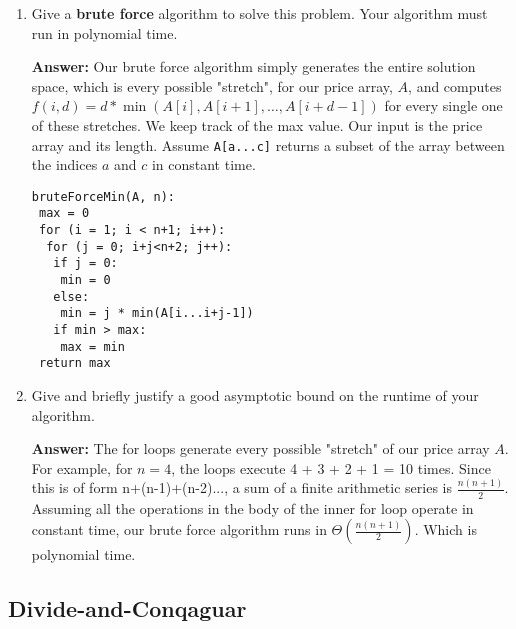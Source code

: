 \documentclass[11pt, oneside]{article}   	%
\theoremstyle{definition}
\theoremstyle{remark}
\begin{document}
\begin{enumerate}
\item Give a \textbf{brute force} algorithm to solve this problem. Your algorithm
   must run in polynomial time.
   
   \textbf{Answer:} Our brute force algorithm simply generates the entire solution space, which is every possible "stretch", for our price array, $A$, and computes $f(i,d) =
d*\min(A[i],A[i+1],\ldots,A[i+d-1])$ for every single one of these stretches. We keep track of the max value. Our input is the price array and its length. Assume \texttt{A[a...c]} returns a subset of the array between the indices $a$ and $c$ in constant time. 
\begin{verbatim}
bruteForceMin(A, n):
 max = 0
 for (i = 1; i < n+1; i++): 
  for (j = 0; i+j<n+2; j++): 
   if j = 0:
    min = 0
   else:
    min = j * min(A[i...i+j-1])
   if min > max:
    max = min
 return max		
\end{verbatim}
\item Give and briefly justify a good asymptotic bound on the runtime of
   your algorithm.
   
   \textbf{Answer: } The for loops generate every possible "stretch" of our price array $A$. For example, for $n=4$, the loops execute 4 + 3 + 2 + 1 = 10 times. Since this is of form n+(n-1)+(n-2)..., a sum of a finite arithmetic series is $\frac{n(n+1)}{2}$. Assuming all the operations in the body of the inner for loop operate in constant time, our brute force algorithm runs in $\Theta(\frac{n(n+1)}{2})$. Which is polynomial time. 
\end{enumerate}
\subsection{Divide-and-Conqaguar}
\label{sec-1-1}
\end{document}
